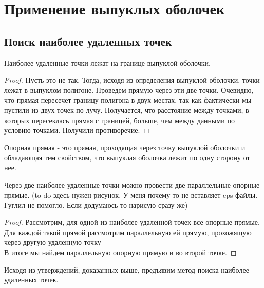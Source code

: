 \section{Применение выпуклых оболочек}
\subsection[title]{Поиск наиболее удаленных точек} 

\begin{statement}
Наиболее удаленные точки лежат на границе выпуклой оболочки.
\begin{proof}
Пусть это не так. Тогда, исходя из определения выпуклой оболочки, точки лежат в выпуклом полигоне. Проведем прямую через эти две точки. 
Очевидно, что прямая пересечет границу полигона в двух местах, так как фактически мы пустили из двух точек по лучу. Получается, что расстояние между точками, в которых пересеклась прямая с границей, больше, чем между данными по условию точками. Получили противоречие.        
\end{proof}
\end{statement}

\begin{definition} 
Опорная прямая - это прямая, проходящая через точку выпуклой оболочки и обладающая тем свойством, что выпуклая оболочка лежит по одну сторону от нее.  
\end{definition}

\begin{statement}
Через две наиболее удаленные точки можно провести две параллельные опорные прямые. 
(to do здесь нужен рисунок. У меня почему-то не вставляет eps файлы. Гуглил не помогло. Если додумаюсь то нарисую сразу же) 
\begin{proof} 
Рассмотрим, для одной из наиболее удаленной точек все опорные прямые. \\
Для каждой такой прямой рассмотрим параллельную ей прямую, прохожящую через другую удаленную точку\\
В итоге мы найдем параллельную опорную прямую и во второй точке.  
\end{proof}
\end{statement}

Исходя из утверждений, доказанных выше, предъявим метод поиска наиболее удаленных точек. \\
